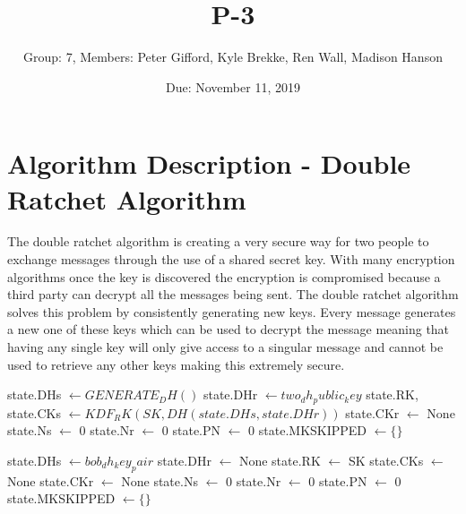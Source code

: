 \documentclass{article}
\title{P-3}
\author{Group: 7, Members: Peter Gifford, Kyle Brekke, Ren Wall, Madison Hanson}
\date{Due: November 11, 2019}
\begin{document}
\maketitle

\section{Algorithm Description - Double Ratchet Algorithm}
The double ratchet algorithm is creating a very secure way for two people to exchange messages through the use of a shared secret key. With many encryption algorithms once the key is discovered the encryption is compromised because a third party can decrypt all the messages being sent. The double ratchet algorithm solves this problem by consistently generating new keys. Every message generates a new one of these keys which can be used to decrypt the message meaning that having any single key will only give access to a singular message and cannot be used to retrieve any other keys making this extremely secure.

\begin{algorithm}
    \begin{algorithmic}
     	\State state.DHs $\gets GENERATE_DH()$
	\State state.DHr $\gets two_dh_public_key$
	\State state.RK, state.CKs $\gets KDF_RK(SK, DH(state.DHs, state.DHr))$
	\State state.CKr $\gets$ None
	\State state.Ns $\gets$ 0
	\State state.Nr $\gets$ 0
	\State state.PN $\gets$ 0
	\State state.MKSKIPPED $\gets \{\}$
    \EndProcedure
    
    	\State state.DHs $\gets bob_dh_key_pair$
	\State state.DHr $\gets$ None
	\State state.RK $\gets$ SK
	\State state.CKs $\gets$ None
	\State state.CKr $\gets$ None
	\State state.Ns $\gets$ 0
	\State state.Nr $\gets$ 0
	\State state.PN $\gets$ 0
	\State state.MKSKIPPED $\gets \{\}$ 
    \EndProcedure
        \end{algorithmic}
    \end{algorithm}
    
\end{document}
